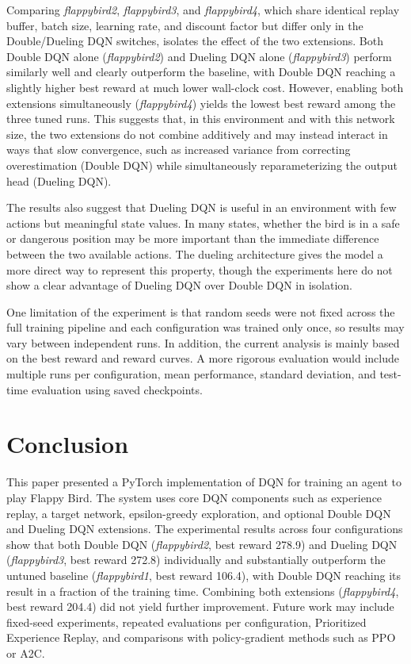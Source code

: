 \documentclass[conference]{IEEEtran}
\begin{document}
Comparing \textit{flappybird2}, \textit{flappybird3}, and \textit{flappybird4}, which share identical replay buffer, batch size, learning rate, and discount factor but differ only in the Double/Dueling DQN switches, isolates the effect of the two extensions. Both Double DQN alone (\textit{flappybird2}) and Dueling DQN alone (\textit{flappybird3}) perform similarly well and clearly outperform the baseline, with Double DQN reaching a slightly higher best reward at much lower wall-clock cost. However, enabling both extensions simultaneously (\textit{flappybird4}) yields the lowest best reward among the three tuned runs. This suggests that, in this environment and with this network size, the two extensions do not combine additively and may instead interact in ways that slow convergence, such as increased variance from correcting overestimation (Double DQN) while simultaneously reparameterizing the output head (Dueling DQN).

The results also suggest that Dueling DQN is useful in an environment with few actions but meaningful state values. In many states, whether the bird is in a safe or dangerous position may be more important than the immediate difference between the two available actions. The dueling architecture gives the model a more direct way to represent this property, though the experiments here do not show a clear advantage of Dueling DQN over Double DQN in isolation.

One limitation of the experiment is that random seeds were not fixed across the full training pipeline and each configuration was trained only once, so results may vary between independent runs. In addition, the current analysis is mainly based on the best reward and reward curves. A more rigorous evaluation would include multiple runs per configuration, mean performance, standard deviation, and test-time evaluation using saved checkpoints.

\section{Conclusion}
This paper presented a PyTorch implementation of DQN for training an agent to play Flappy Bird. The system uses core DQN components such as experience replay, a target network, epsilon-greedy exploration, and optional Double DQN and Dueling DQN extensions. The experimental results across four configurations show that both Double DQN (\textit{flappybird2}, best reward 278.9) and Dueling DQN (\textit{flappybird3}, best reward 272.8) individually and substantially outperform the untuned baseline (\textit{flappybird1}, best reward 106.4), with Double DQN reaching its result in a fraction of the training time. Combining both extensions (\textit{flappybird4}, best reward 204.4) did not yield further improvement. Future work may include fixed-seed experiments, repeated evaluations per configuration, Prioritized Experience Replay, and comparisons with policy-gradient methods such as PPO or A2C.
\end{document}
